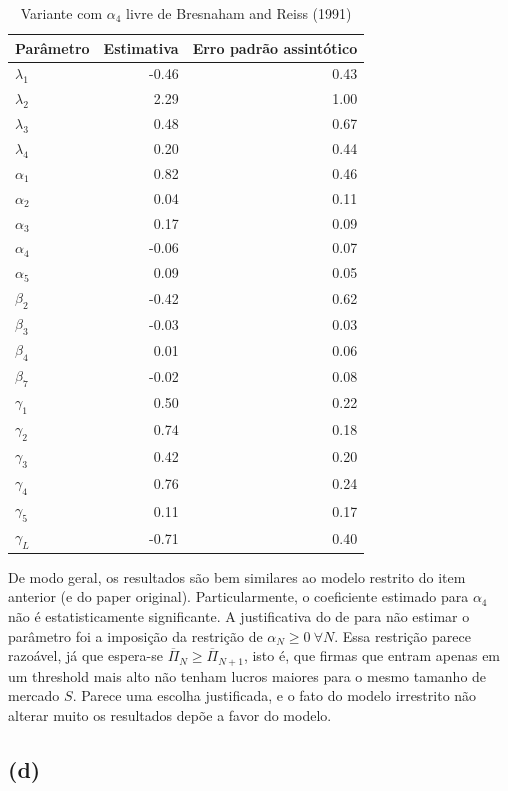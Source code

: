 \documentclass{article}
\begin{document}
\begin{table}[H]
    \centering
\begin{tabular}{lrr}
\hline
 Parâmetro&Estimativa& Erro padrão assintótico\\
\hline
$\lambda_1$ &-0.46 & 0.43\\
$\lambda_2$ &2.29 & 1.00\\
$\lambda_3$ &0.48 & 0.67\\
$\lambda_4$ &0.20 & 0.44\\
$\alpha_1$ &0.82 & 0.46\\
$\alpha_2$ &0.04 & 0.11\\
$\alpha_3$ &0.17 & 0.09\\
$\alpha_4$ &-0.06 & 0.07\\
$\alpha_5$ &0.09 & 0.05\\
$\beta_2$ &-0.42 & 0.62\\
$\beta_3$ &-0.03 & 0.03\\
$\beta_4$ &0.01 & 0.06\\
$\beta_7$ &-0.02 & 0.08\\
$\gamma_1$&0.50 & 0.22\\
$\gamma_2$&0.74 & 0.18\\
$\gamma_3$&0.42 & 0.20\\
$\gamma_4$&0.76 & 0.24\\
$\gamma_5$&0.11 & 0.17\\
$\gamma_L$&-0.71 & 0.40\\
\hline
\end{tabular}
    \caption{Variante com $\alpha_4$ livre de Bresnaham and Reiss (1991)}
    \label{bresnalpha4}
\end{table}

De modo geral, os resultados são bem similares ao modelo restrito do item anterior (e do paper original). Particularmente, o coeficiente estimado para $\alpha_4$ não é estatisticamente significante. A justificativa do de  para não estimar o parâmetro foi a imposição da restrição de $\alpha_N \geq 0\: \forall N$. Essa restrição parece razoável, já que espera-se $\overline{\Pi}_N \geq \overline{\Pi}_{N+1}$, isto é, que firmas que entram apenas em um threshold mais alto não tenham lucros maiores para o mesmo tamanho de mercado $S$. Parece uma escolha justificada, e o fato do modelo irrestrito não alterar muito os resultados depõe a favor do modelo.

\subsection*{(d)}
\end{document}

